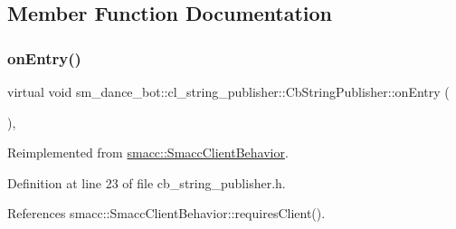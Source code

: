 \subsection{Member Function Documentation}
\mbox{\label{classsm__dance__bot_1_1cl__string__publisher_1_1CbStringPublisher_a7aa533578e820ee90d92d15b85d42e9b}} 
\subsubsection{\texorpdfstring{on\+Entry()}{onEntry()}}
{\footnotesize\ttfamily virtual void sm\+\_\+dance\+\_\+bot\+::cl\+\_\+string\+\_\+publisher\+::\+Cb\+String\+Publisher\+::on\+Entry (\begin{DoxyParamCaption}{ }\end{DoxyParamCaption})\hspace{0.3cm}{\ttfamily [inline]}, {\ttfamily [virtual]}}



Reimplemented from \hyperlink{classsmacc_1_1SmaccClientBehavior_a7962382f93987c720ad432fef55b123f}{smacc\+::\+Smacc\+Client\+Behavior}.



Definition at line 23 of file cb\+\_\+string\+\_\+publisher.\+h.



References smacc\+::\+Smacc\+Client\+Behavior\+::requires\+Client().


